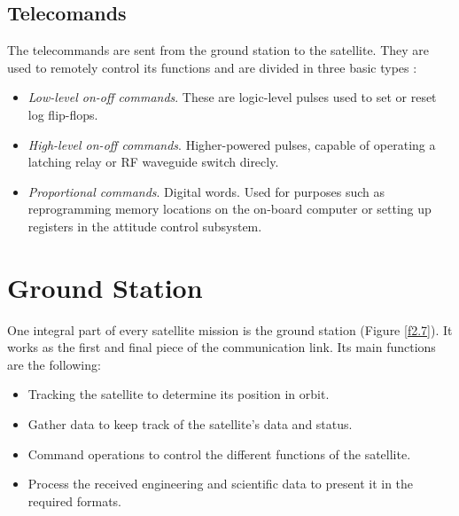 \pagebreak
\subsection{Telecomands}
The telecommands are sent from the ground station to the satellite. They are used to remotely control its functions and are divided in three basic types \cite{SSEng}:
\begin{itemize}
\item \emph{Low-level on-off commands}. These are logic-level pulses used to set or reset log flip-flops.
\item \emph{High-level on-off commands}. Higher-powered pulses, capable of operating a latching relay or RF waveguide switch direcly.
\item \emph{Proportional commands}. Digital words. Used for purposes such as reprogramming memory locations on the on-board computer or setting up registers in the attitude control subsystem.

\end{itemize}


\section{Ground Station}
One integral part of every satellite mission is the ground station (Figure \ref{f2.7}). It works as the first and final piece of the communication link. Its main functions are the following:
\begin{itemize}
\item Tracking the satellite to determine its position in orbit.
\item Gather data to keep track of the satellite's data and status.
\item Command operations to control the different functions of the satellite.
\item Process the received engineering and scientific data to present it in the required formats.
\end{itemize}


